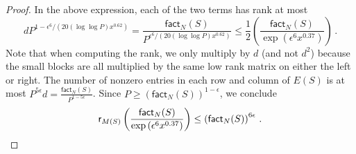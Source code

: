 \documentclass[11pt]{article}
\numberwithin{equation}{section}
\theoremstyle{definition}
\theoremstyle{plain}
\theoremstyle{definition}
\renewcommand\fact{\textsf{fact}}
\begin{document}
\begin{proof}
In the above expression, each of the two terms has rank at most 
\[
dP^{1 - \epsilon^6/(20(\log \log P) x^{0.62})} = \frac{\fact_N(S)}{P^{\epsilon^6/(20(\log \log P) x^{0.62})}} \leq \frac{1}{2}\left( \frac{\fact_N(S)}{\exp\left(\epsilon^6 x^{0.37}\right)} \right) \,.
\]
Note that when computing the rank, we only multiply by $d$ (and not $d^2$) because the small blocks are all multiplied by the same low rank matrix on either the left or right. The number of nonzero entries in each row and column of $E(S)$ is at most $P^{5\epsilon}d = \frac{\fact_N(S)}{P^{1-5\epsilon}}$.  Since $P \geq \left( \fact_N(S) \right)^{1 - \epsilon}$,  we conclude 
\[
\textsf{r}_{M(S)}\left( \frac{\fact_N(S)}{\exp\left(\epsilon^6 x^{0.37}\right)} \right) \leq \left(\fact_N(S)\right)^{6 \epsilon} \,. \qedhere
\]
\end{proof}
\end{document}
